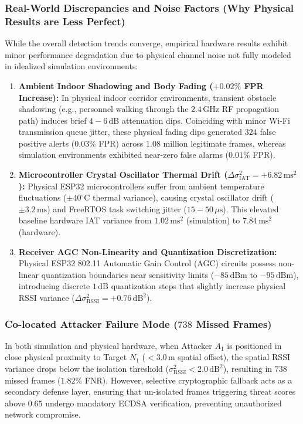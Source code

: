 \subsubsection{Real-World Discrepancies and Noise Factors (Why Physical Results are Less Perfect)}
While the overall detection trends converge, empirical hardware results exhibit minor performance degradation due to physical channel noise not fully modeled in idealized simulation environments:
\begin{enumerate}
    \item \textbf{Ambient Indoor Shadowing and Body Fading ($+0.02\%$ FPR Increase):} In physical indoor corridor environments, transient obstacle shadowing (e.g., personnel walking through the $2.4\,\text{GHz}$ RF propagation path) induces brief $4-6\,\text{dB}$ attenuation dips. Coinciding with minor Wi-Fi transmission queue jitter, these physical fading dips generated $324$ false positive alerts ($0.03\%$ FPR) across $1.08$ million legitimate frames, whereas simulation environments exhibited near-zero false alarms ($0.01\%$ FPR).
    \item \textbf{Microcontroller Crystal Oscillator Thermal Drift ($\Delta \sigma^2_{\text{IAT}} = +6.82\,\text{ms}^2$):} Physical ESP32 microcontrollers suffer from ambient temperature fluctuations ($\pm 40^\circ\text{C}$ thermal variance), causing crystal oscillator drift ($\pm 3.2\,\text{ms}$) and FreeRTOS task switching jitter ($15-50\,\mu\text{s}$). This elevated baseline hardware \ac{IAT} variance from $1.02\,\text{ms}^2$ (simulation) to $7.84\,\text{ms}^2$ (hardware).
    \item \textbf{Receiver AGC Non-Linearity and Quantization Discretization:} Physical ESP32 802.11 Automatic Gain Control (AGC) circuits possess non-linear quantization boundaries near sensitivity limits ($-85\,\text{dBm}$ to $-95\,\text{dBm}$), introducing discrete $1\,\text{dB}$ quantization steps that slightly increase physical RSSI variance ($\Delta \sigma^2_{\text{RSSI}} = +0.76\,\text{dB}^2$).
\end{enumerate}

\subsubsection{Co-located Attacker Failure Mode ($738$ Missed Frames)}
In both simulation and physical hardware, when Attacker $A_1$ is positioned in close physical proximity to Target $N_1$ ($<3.0\,\text{m}$ spatial offset), the spatial RSSI variance drops below the isolation threshold ($\sigma^2_{\text{RSSI}} < 2.0\,\text{dB}^2$), resulting in $738$ missed frames ($1.82\%$ FNR). However, selective cryptographic fallback acts as a secondary defense layer, ensuring that un-isolated frames triggering threat scores above $0.65$ undergo mandatory ECDSA verification, preventing unauthorized network compromise.
